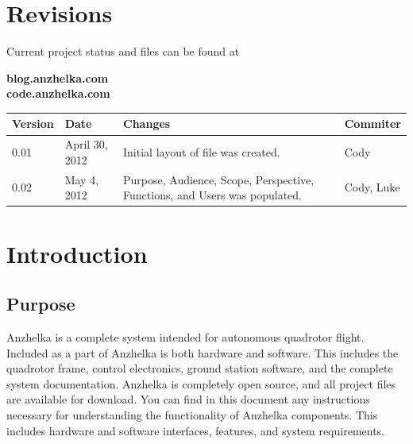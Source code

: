 \documentclass[english]{article}
\numberwithin{equation}{section} %
\begin{document}

\renewcommand{\contentsname}{Table of Contents}
\tableofcontents


\section*{Revisions}
Current project status and files can be found at
\begin{center}
 \textbf{blog.anzhelka.com} \\
 \textbf{code.anzhelka.com} \\
\end{center}

\begin{longtable}{l | l | p{5cm} | l}
\hline
\textbf{Version} & \textbf{Date} & \textbf{Changes} & \textbf{Commiter}\\
\hline
0.01	& April 30, 2012 & Initial layout of file was created. 	& Cody \\
\hline
0.02	& May 4, 2012 & Purpose, Audience, Scope, Perspective, Functions, and Users was populated. & Cody, Luke \\
\hline
\end{longtable}



\newpage
{}




\section{Introduction}
\subsection{Purpose}
Anzhelka is a complete system intended for autonomous quadrotor flight. Included as a part of Anzhelka is both hardware and software. This includes the quadrotor frame, control electronics, ground station software, and the complete system documentation. Anzhelka is completely open source, and all project files are available for download. You can find in this document any instructions necessary for understanding the functionality of Anzhelka components. This includes hardware and software interfaces, features, and system requirements.
\end{document}
